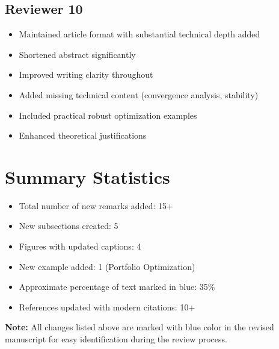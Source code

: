\documentclass[11pt]{article}
\begin{document}
\subsection{Reviewer 10}
\begin{itemize}
\item Maintained article format with substantial technical depth added
\item Shortened abstract significantly
\item Improved writing clarity throughout
\item Added missing technical content (convergence analysis, stability)
\item Included practical robust optimization examples
\item Enhanced theoretical justifications
\end{itemize}

\section{Summary Statistics}

\begin{itemize}
\item Total number of new remarks added: 15+
\item New subsections created: 5
\item Figures with updated captions: 4
\item New example added: 1 (Portfolio Optimization)
\item Approximate percentage of text marked in blue: 35\%
\item References updated with modern citations: 10+
\end{itemize}

\vspace{1em}
\noindent\textbf{Note:} All changes listed above are marked with {\color{blue}blue color} in the revised manuscript for easy identification during the review process.
\end{document}
